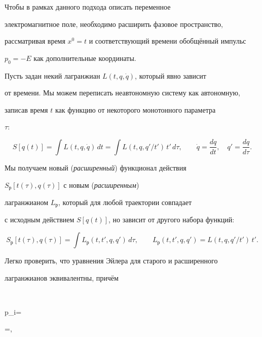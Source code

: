 


\smallskip



  Чтобы в рамках данного подхода описать  переменное

  электромагнитное поле, необходимо расширить фазовое пространство,

  рассматривая время $x^0=t$ и соответствующий времени обобщённый импульс

  $p_0=-E$ как дополнительные координаты.




Пусть задан некий лагранжиан $L(t,q,\dot q)$, который явно зависит

от времени. Мы можем переписать неавтономную систему как автономную,

записав время $t$ как функцию от некоторого монотонного параметра

$\tau$:

$$

  S[q(t)]=\int L(t,q,\dot q)\,dt

  =\int L(t,q,q'/t')\,t'\,d\tau,\qquad

\dot q=\frac{dq}{dt},\quad q'=\frac{dq}{d\tau}.

$$

Мы получаем новый (\emph{расширенный}) функционал действия

$S_\textrm{р}[t(\tau),q(\tau)]$ с новым (\emph{расширенным})

лагранжианом $L_\textrm{р}$, который для любой траектории совпадает

с исходным действием $S[q(t)]$, но зависит от другого набора функций:

$$

  S_\textrm{р}[t(\tau),q(\tau)]=\int

  L_\textrm{р}(t,t',q,q')\,d\tau,\qquad

  L_\textrm{р}(t,t',q,q')=L(t,q,q'/t')\,t'.

$$

 Легко проверить, что уравнения Эйлера для старого и расширенного

 лагранжианов эквивалентны, причём

$$

  p_i=

  =,\qquad

